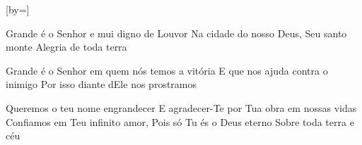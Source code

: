 \documentclass[
    a4paper,
    12pt
]{article}
\begin{document}
\extras

\begin{songs}{}
    \beginsong{\showtitulo}[by={\showartista}]
    
    
    \beginverse
     \esp{}
    \nolyrics
    \barra 
    \endverse
    
    \beginverse
    Grande é o Senhor e mui digno de Louvor
    Na cidade do nosso Deus, Seu santo monte
    Alegria de toda terra
    \endverse
    
    \beginverse
    Grande é o Senhor em quem nós temos a vitória
    E que nos ajuda contra o inimigo
    Por isso diante dEle nos prostramos
    \endverse
    
    \beginchorus
    \tab {}
    \tab Queremos o teu nome engrandecer 
    \tab E agradecer-Te por Tua obra em nossas vidas
    \tab Confiamos em Teu infinito amor,
    \tab Pois só Tu és o Deus eterno
    \tab Sobre toda terra e céu
    \endchorus
    
    \endsong
\end{songs}
\end{document}
